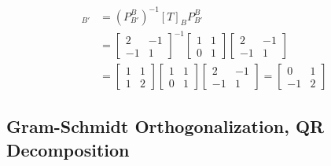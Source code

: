 \begin{solution}
\begin{align*}
[T]_{B'} &= (P_{B'}^B)^{-1} [T]_B P_{B'}^B \\
&= 
\begin{bmatrix}
2 & -1 \\
-1 & 1
\end{bmatrix}^{-1}
\begin{bmatrix}
1 & 1 \\
0 & 1
\end{bmatrix}
\begin{bmatrix}
2 & -1 \\
-1 & 1
\end{bmatrix} \\
&= 
\begin{bmatrix}
1 & 1 \\
1 & 2
\end{bmatrix}
\begin{bmatrix}
1 & 1 \\
0 & 1
\end{bmatrix}
\begin{bmatrix}
2 & -1 \\
-1 & 1
\end{bmatrix}
=
\begin{bmatrix}
0 & 1\\
-1 & 2
\end{bmatrix}
\end{align*}
\end{solution}

\subsection{Gram-Schmidt Orthogonalization, QR Decomposition}
\label{section:GSortho}


